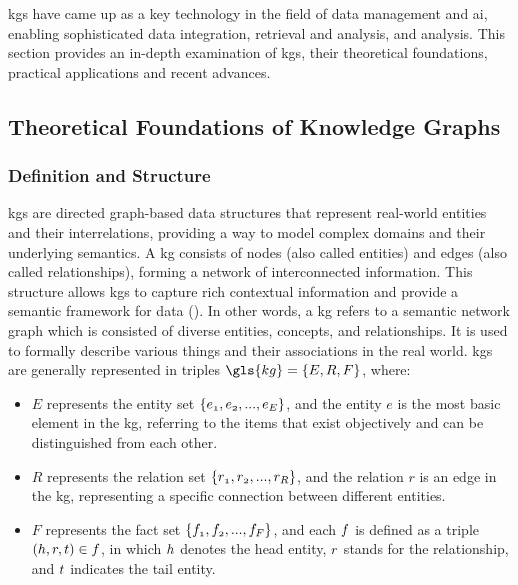 \glspl{kg} have came up as a key technology in the field of data management and \gls{ai}, enabling sophisticated data integration, retrieval and analysis, and analysis.
This section provides an in-depth examination of \glspl{kg}, their theoretical foundations, practical applications and recent advances.

\subsection*{Theoretical Foundations of Knowledge Graphs}
\subsubsection*{Definition and Structure}
\glspl{kg} are directed graph-based data structures that represent real-world entities and their interrelations, providing a way to model complex domains and their underlying semantics.
A \gls{kg} consists of nodes (also called entities) and edges (also called relationships), forming a network of interconnected information.
This structure allows \glspl{kg} to capture rich contextual information and provide a semantic framework for data (\cite{Hogan2021}).
In other words, a \gls{kg} refers to a semantic network graph which is consisted of diverse entities, concepts, and relationships.
It is used to formally describe various things and their associations in the real world.
\glspl{kg} are generally represented in triples $\gls{kg}=\{\mathnormal{E,R,F}\}$, where:
\begin{itemize}
    \item $E$ represents the entity set $\{\mathnormal{e_1, e_2, ... ,e_E} \}$, and the entity $e$ is the most basic element in the \gls{kg}, referring to the items that exist objectively and can be distinguished from each other.
    \item $R$ represents the relation set $\{\mathnormal{r_1, r_2, ... ,r_R}\}$, and the relation $r$ is an edge in the \gls{kg}, representing a specific connection between different entities.
    \item $F$ represents the fact set $\{\mathnormal{f_1,f_2, ... ,f_F}\}$, and each $\mathnormal{f}$ is defined as a triple $(\mathnormal{h,r,t}) \in \mathnormal{f}$, in which $\mathnormal{h}$ denotes the head entity, $\mathnormal{r}$ stands for the relationship, and $\mathnormal{t}$ indicates the tail entity.
\end{itemize}

